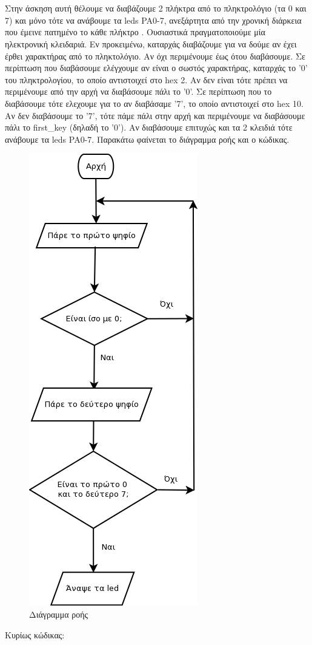 \section{}
Στην άσκηση αυτή θέλουμε να διαβάζουμε 2 πλήκτρα από το πληκτρολόγιο (τα 0 και
7) και μόνο τότε να ανάβουμε τα leds PA0-7, ανεξάρτητα από την χρονική
διάρκεια που έμεινε πατημένο το κάθε πλήκτρο . Ουσιαστικά πραγματοποιούμε μία
ηλεκτρονική κλειδαριά.  Εν προκειμένω, καταρχάς διαβάζουμε για να δούμε αν
έχει έρθει χαρακτήρας από το πληκτολόγιο. Αν όχι περιμένουμε έως ότου
διαβάσουμε.  Σε περίπτωση που διαβάσουμε ελέγχουμε αν είναι ο σωστός
χαρακτήρας, καταρχάς το '0' του πληκτρολογίου, το οποίο αντιστοιχεί στο hex 2.
Αν δεν είναι τότε πρέπει να περιμένουμε από την αρχή να διαβάσουμε πάλι το
'0'. Σε περίπτωση που το διαβάσουμε τότε ελεχουμε για το αν διαβάσαμε '7', το
οποίο αντιστοιχεί στο hex 10. Αν δεν διαβάσουμε το '7', τότε πάμε πάλι στην
αρχή και περιμένουμε να διαβάσουμε πάλι το first\_key (δηλαδή το '0').  Αν
διαβάσουμε επιτυχώς και τα 2 κλειδιά τότε ανάβουμε τα leds PA0-7. Παρακάτω
φαίνεται το διάγραμμα ροής και ο κώδικας.

\begin{figure}[H]
	\centering
	\includegraphics[height=0.5\textheight]{files/flowchart.png}
	\caption{Διάγραμμα ροής}
\end{figure}

\noindent Κυρίως κώδικας:
\inputminted[linenos,obeytabs,fontsize=\footnotesize]{c}{files/part3.S}

